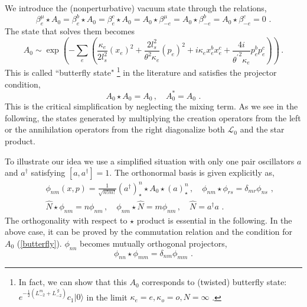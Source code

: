 \documentclass[a4paper,aps,preprint,nofootinbib,eqsecnum]{revtex4}
\begin{document}
We introduce the (nonperturbative) vacuum state through the relations,
\begin{equation}
\beta _{e}^{\mu }\star A_{0}=\beta _{e}^{b}\star A_{0}=\beta _{e}^{c}\star
A_{0}=A_{0}\star \beta _{-e}^{\mu }=A_{0}\star \beta _{-e}^{b}=A_{0}\star
\beta _{-e}^{c}=0\,\,.
\end{equation}%
The state that solves them becomes
\begin{equation}
A_{0}\sim \exp \left( -\sum_{e}\left( \frac{\kappa _{e}}{2l_{s}^{2}}%
(x_{e})^{2}+\frac{2l_{s}^{2}}{\theta ^{2}\kappa _{e}}(p_{e})^{2}+i\kappa
_{e}x_{e}^{b}x_{e}^{c}+\frac{4i}{{\theta ^{\prime }}^{2}\kappa _{e}}%
p_{e}^{b}p_{e}^{c}\right) \right) \,.  \label{butterfly}
\end{equation}%
This is called \textquotedblleft butterfly state" \footnote{%
In fact, we can show that this $A_{0}$ corresponds to (twisted) butterfly
state: $e^{-{\frac{1}{2}}(L_{-2}^{m}+L_{-2}^{^{\prime }g})}c_{1}|0\rangle $
in the limit $\kappa _{e}=e,\kappa _{o}=o,N=\infty $ \cite{PREP}.} in the
literature \cite{VSFT} and satisfies the projector condition,
\begin{equation}
A_{0}\star A_{0}=A_{0}\,,\quad A_{0}^{\ast }=A_{0}\,\,.
\end{equation}%
This is the critical simplification by neglecting the mixing term. As we see
in the following, the states generated by multiplying the creation operators
from the left or the annihilation operators from the right diagonalize both $%
{\mathcal{L}_{0}}$ and the star product.

To illustrate our idea we use a simplified situation with only one pair
oscillators $a$ and $a^{\dagger }$ satisfying $[a,a^{\dagger }]=1$. The
orthonormal basis is given explicitly as,
\begin{eqnarray}
&&\phi _{nm}(x,p)=\frac{1}{\sqrt{n!m!}}(a^{\dagger })_{\star }^{n}\star
A_{0}\star (a)_{\star }^{n}\,,\quad \phi _{nm}\star \phi _{rs}=\delta
_{mr}\phi _{ns}\,\,, \\
&&\hat{N}\star \phi _{nm}=n\phi _{nm}\,,\quad \phi _{nm}\star \hat{N}=m\phi
_{nm}\,,\quad \hat{N}=a^{\dagger }a\,\,.
\end{eqnarray}%
The orthogonality with respect to $\star $ product is essential in the
following. In the above case, it can be proved by the commutation relation
and the condition for $A_{0}$ (\ref{butterfly}). $\phi _{nn}$ becomes
mutually orthogonal projectors,
\begin{equation}
\phi _{nn}\star \phi _{mm}=\delta _{nm}\phi _{mm}\,\,.
\end{equation}
\end{document}
